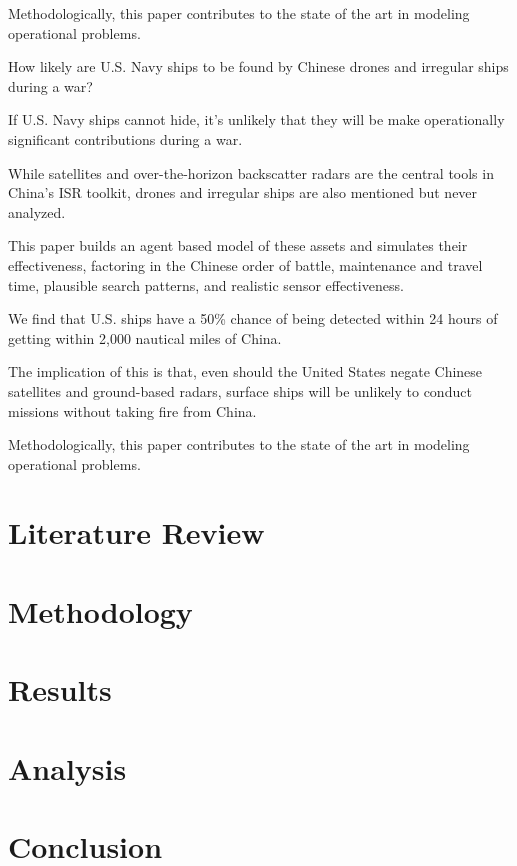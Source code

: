 \documentclass[12pt]{article}
\begin{document}
Methodologically, this paper contributes to the state of the art in modeling operational problems.

\noindent How likely are U.S. Navy ships to be found by Chinese drones and irregular ships during a war?

\noindent If U.S. Navy ships cannot hide, it's unlikely that they will be make operationally significant contributions during a war.

\noindent While satellites and over-the-horizon backscatter radars are the central tools in China's ISR toolkit, drones and irregular ships are also mentioned but never analyzed.

\noindent This paper builds an agent based model of these assets and simulates their effectiveness, factoring in the Chinese order of battle, maintenance and travel time, plausible search patterns, and realistic sensor effectiveness.

\noindent We find that U.S. ships have a 50\% chance of being detected within 24 hours of getting within 2,000 nautical miles of China.

\noindent The implication of this is that, even should the United States negate Chinese satellites and ground-based radars, surface ships will be unlikely to conduct missions without taking fire from China.

\noindent Methodologically, this paper contributes to the state of the art in modeling operational problems.

\section{Literature Review}

\section{Methodology}

\section{Results}

\section{Analysis}

\section{Conclusion}
\end{document}
